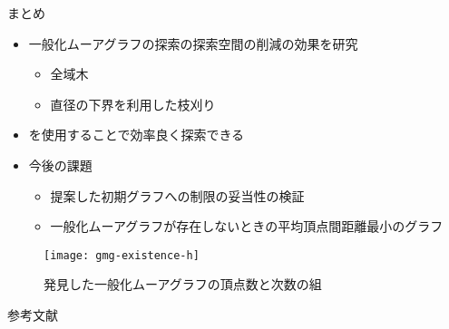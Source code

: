 \begin{frame}{まとめ}
  \begin{itemize}
  \item 一般化ムーアグラフの探索の探索空間の削減の効果を研究
    \begin{itemize}
    \item 全域木
    \item 直径の下界を利用した枝刈り
    \end{itemize}
  \item[] を使用することで効率良く探索できる
  \item 今後の課題
    \begin{itemize}
    \item 提案した初期グラフへの制限の妥当性の検証
    \item 一般化ムーアグラフが存在しないときの平均頂点間距離最小のグラフ
    \end{itemize}
  \end{itemize}
  \begin{figure}
    \centering
    \texttt{[image: gmg-existence-h]}
    \caption{発見した一般化ムーアグラフの頂点数と次数の組}
  \end{figure}
\end{frame}

\appendix

\begin{frame}[allowframebreaks]{参考文献}
  
\end{frame}


